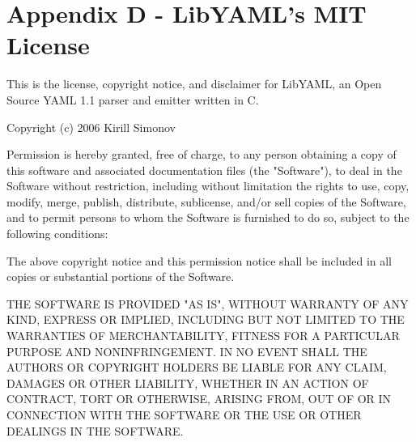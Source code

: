 \chapter*{Appendix D - LibYAML's MIT License}
\noindent This is the license, copyright notice, and disclaimer for LibYAML, an
Open Source YAML 1.1 parser and emitter written in C.

\bigskip
\noindent Copyright (c) 2006 Kirill Simonov

\bigskip
\noindent Permission is hereby granted, free of charge, to any person obtaining a copy of
this software and associated documentation files (the "Software"), to deal in
the Software without restriction, including without limitation the rights to
use, copy, modify, merge, publish, distribute, sublicense, and/or sell copies
of the Software, and to permit persons to whom the Software is furnished to do
so, subject to the following conditions:

\bigskip
\noindent The above copyright notice and this permission notice shall be included in all
copies or substantial portions of the Software.

\bigskip
\noindent THE SOFTWARE IS PROVIDED "AS IS", WITHOUT WARRANTY OF ANY KIND, EXPRESS OR
IMPLIED, INCLUDING BUT NOT LIMITED TO THE WARRANTIES OF MERCHANTABILITY,
FITNESS FOR A PARTICULAR PURPOSE AND NONINFRINGEMENT. IN NO EVENT SHALL THE
AUTHORS OR COPYRIGHT HOLDERS BE LIABLE FOR ANY CLAIM, DAMAGES OR OTHER
LIABILITY, WHETHER IN AN ACTION OF CONTRACT, TORT OR OTHERWISE, ARISING FROM,
OUT OF OR IN CONNECTION WITH THE SOFTWARE OR THE USE OR OTHER DEALINGS IN THE
SOFTWARE.

